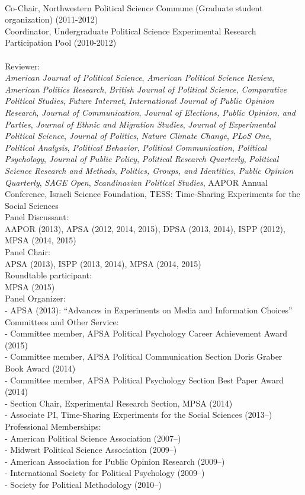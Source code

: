 \documentclass[12pt]{article}
\newcommand{\topic}[1]{\pagebreak[3]\indent {\color{lg}{\footnotesize #1 }}\\}
\newcommand{\entry}[1]{\indent {\color{lg}\guillemotright}\hspace{2pt}#1\vspace{.25em}\\}
\newcommand{\subentry}[1]{{\color{lg}-} #1\vspace{.25em}\\}
\begin{document}
\topic{Departmental (Northwestern University)}
\entry{Co-Chair, Northwestern Political Science Commune (Graduate student organization) (2011-2012)}
\entry{Coordinator, Undergraduate Political Science Experimental Research Participation Pool (2010-2012)}

\topic{Disciplinary}
\entry{Reviewer:\\{\em American Journal of Political Science}, {\em American Political Science Review}, {\em American Politics Research}, {\em British Journal of Political Science}, {\em Comparative Political Studies}, {\em Future Internet}, {\em International Journal of Public Opinion Research}, {\em Journal of Communication}, {\em Journal of Elections, Public Opinion, and Parties}, {\em Journal of Ethnic and Migration Studies}, {\em Journal of Experimental Political Science}, {\em Journal of Politics}, {\em Nature Climate Change}, {\em PLoS One}, {\em Political Analysis}, {\em Political Behavior}, {\em Political Communication}, {\em Political Psychology}, {\em Journal of Public Policy}, {\em Political Research Quarterly}, {\em Political Science Research and Methods}, {\em Politics, Groups, and Identities}, {\em Public Opinion Quarterly}, {\em SAGE Open}, {\em Scandinavian Political Studies}, AAPOR Annual Conference, Israeli Science Foundation, TESS: Time-Sharing Experiments for the Social Sciences}
\entry{Panel Discussant:\\AAPOR (2013), APSA (2012, 2014, 2015), DPSA (2013, 2014), ISPP (2012), MPSA (2014, 2015)}
\entry{Panel Chair:\\APSA (2013), ISPP (2013, 2014), MPSA (2014, 2015)}
\entry{Roundtable participant:\\MPSA (2015)}
\entry{Panel Organizer:}
\subentry{APSA (2013): ``Advances in Experiments on Media and Information Choices''}
\entry{Committees and Other Service:}
\subentry{Committee member, APSA Political Psychology Career Achievement Award (2015)}
\subentry{Committee member, APSA Political Communication Section Doris Graber Book Award (2014)}
\subentry{Committee member, APSA Political Psychology Section Best Paper Award (2014)}
\subentry{Section Chair, Experimental Research Section, MPSA (2014)}
\subentry{Associate PI, Time-Sharing Experiments for the Social Sciences (2013--)}
\entry{Professional Memberships:}
\subentry{American Political Science Association (2007--)}
\subentry{Midwest Political Science Association (2009--)}
\subentry{American Association for Public Opinion Research (2009--)}
\subentry{International Society for Political Psychology (2009--)}
\subentry{Society for Political Methodology (2010--)}
\end{document}
